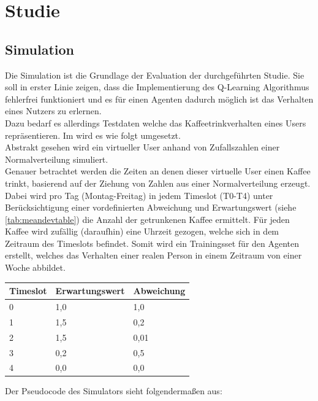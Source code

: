 \chapter{Studie}
\label{kap:Kapitel04}

\section{Simulation}
Die Simulation ist die Grundlage der Evaluation der durchgeführten Studie. Sie soll in erster Linie zeigen, dass die Implementierung des Q-Learning Algorithmus fehlerfrei funktioniert und es für einen Agenten dadurch möglich ist das Verhalten eines Nutzers zu erlernen. \\
Dazu bedarf es allerdings Testdaten welche das Kaffeetrinkverhalten eines Users repräsentieren. Im  wird es wie folgt umgesetzt.\\
Abstrakt gesehen wird ein virtueller User anhand von Zufallszahlen einer Normalverteilung simuliert.\\
Genauer betrachtet werden die Zeiten an denen dieser virtuelle User einen Kaffee trinkt, basierend auf der Ziehung von Zahlen aus einer Normalverteilung erzeugt.\\ Dabei wird pro Tag (Montag-Freitag) in jedem Timeslot (T0-T4) unter Berücksichtigung einer vordefinierten Abweichung und Erwartungswert (siehe \ref{tab:meandevtable}) die Anzahl der getrunkenen Kaffee ermittelt. Für jeden Kaffee wird zufällig (daraufhin) eine Uhrzeit gezogen, welche sich in dem Zeitraum des Timeslots befindet. Somit wird ein Trainingsset für den Agenten erstellt, welches das Verhalten einer realen Person in einem Zeitraum von einer Woche abbildet.


\begin{center}
    \label{tab:meandevtable}
    \begin{tabular}{| l | l | l |}
    \hline
    Timeslot & Erwartungswert & Abweichung \\ \hline
    0 & 1,0 & 1,0 \\ \hline
    1 & 1,5 & 0,2 \\ \hline
    2 & 1,5 & 0,01 \\ \hline
    3 & 0,2 & 0,5 \\ \hline
    4 & 0,0 & 0,0 \\ \hline
    \end{tabular}
\end{center}


Der Pseudocode des Simulators sieht folgendermaßen aus:

